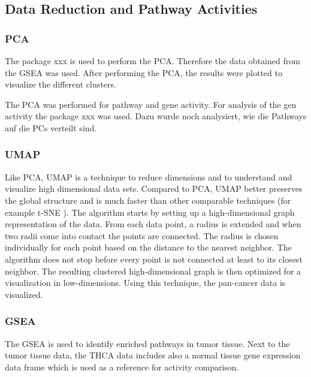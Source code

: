 \documentclass[
]{article}
\begin{document}
\hypertarget{data-reduction-and-pathway-activities}{%
\subsection{Data Reduction and Pathway
Activities}\label{data-reduction-and-pathway-activities}}

\hypertarget{pca}{%
\subsubsection{PCA}\label{pca}}

The package xxx is used to perform the PCA. Therefore the data obtained
from the GSEA was used. After performing the PCA, the results were
plotted to visualize the different clusters.

The PCA was performed for pathway and gene activity. For analysis of the
gen activity the package xxx was used. Dazu wurde noch analysiert, wie
die Pathways auf die PCs verteilt sind.

\hypertarget{umap}{%
\subsubsection{UMAP}\label{umap}}

Like PCA, UMAP is a technique to reduce dimensions and to understand and
visualize high dimensional data sets. Compared to PCA, UMAP better
preserves the global structure and is much faster than other comparable
techniques (for example t-SNE \cite{xxx}). The algorithm starts by
setting up a high-dimensional graph representation of the data. From
each data point, a radius is extended and when two radii come into
contact the points are connected. The radius is chosen individually for
each point based on the distance to the nearest neighbor. The algorithm
does not stop before every point is not connected at least to its
closest neighbor. The resulting clustered high-dimensional graph is then
optimized for a visualization in low-dimensions. Using this technique,
the pan-cancer data is visualized.

\hypertarget{gsea}{%
\subsubsection{GSEA}\label{gsea}}

The GSEA is used to identify enriched pathways in tumor tissue. Next to
the tumor tissue data, the THCA data includes also a normal tissue gene
expression data frame which is used as a reference for activity
comparison.
\end{document}
